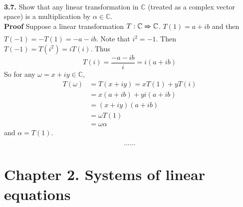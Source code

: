 \documentclass[11pt, a4paper]{article}
\begin{document}
\\
\textbf{3.7.} Show that any linear transformation in $\mathbb{C}$ (treated as a complex vector space) is a multiplication by $\alpha \in \mathbb{C}$.\\
\textbf{Proof} Suppose a linear transformation $T: \mathbb{C} \xRightarrow{} \mathbb{C}$. $T(1)=a+ib$ and then $T(-1)=-T(1)=-a-ib$. Note that $i^2=-1$. Then $T(-1)=T(i^2)=iT(i)$. Thus 
$$ T(i)=\frac{-a-ib}{i}=i(a+ib)$$
So for any $\omega=x+iy \in \mathbb{C}$,
\begin{equation*}
\begin{split}
    T(\omega) & = T(x+iy) = xT(1)+yT(i) \\
              & = x(a+ib)+yi(a+ib) \\
              & = (x+iy)(a+ib) \\
              & = \omega T(1) \\
              & = \omega \alpha
\end{split}
\end{equation*}
and $\alpha = T(1)$.

$$......$$
\section*{Chapter 2. Systems of linear equations}
\end{document}
